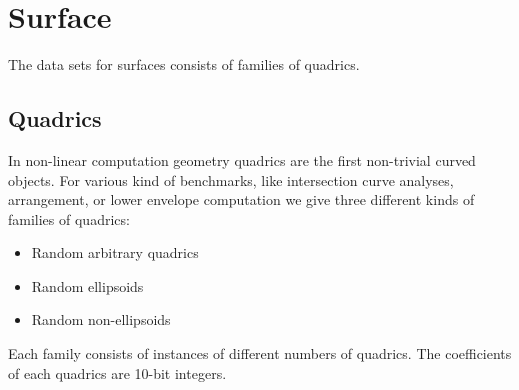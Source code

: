 \section{Surface\label{bi_sec:Surface}}

The data sets for surfaces consists of families of quadrics.

\subsection{Quadrics\label{bi_ssec:Quadrics}}

In non-linear computation geometry quadrics are the first non-trivial
curved objects. For various kind of benchmarks, like intersection
curve analyses, arrangement, or lower envelope computation we give
three different kinds of families of quadrics: 
\begin{itemize}
\item Random arbitrary quadrics\\
\item Random ellipsoids
\item Random non-ellipsoids
\end{itemize}

Each family consists of instances of different numbers of quadrics. The
coefficients of each quadrics are 10-bit integers.

